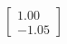 \documentclass[preview]{standalone}
\begin{document}
\begin{align*}
\begin{bmatrix} 1.00 \\ -1.05 \end{bmatrix}
\end{align*}
\end{document}
